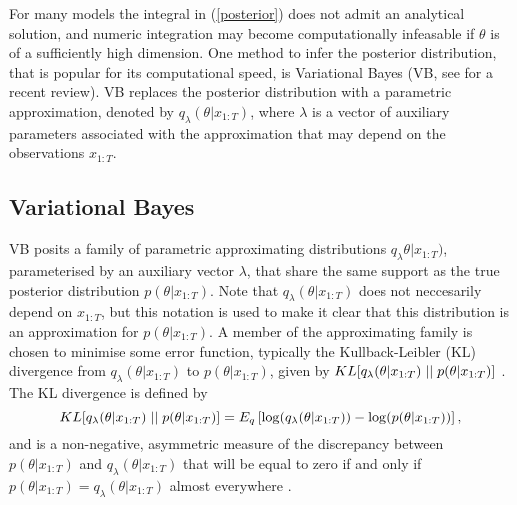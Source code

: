 \documentclass[12pt,a4paper]{article}\usepackage[]{graphicx}\usepackage[]{color}
\begin{document}
For many models the integral in (\ref{posterior}) does not admit an analytical solution, and numeric integration may become computationally infeasable if $\theta$ is of a sufficiently high dimension. One method to infer the posterior distribution, that is popular for its computational speed, is Variational Bayes (VB, see \citet{Blei2017} for a recent review). VB replaces the posterior distribution with a parametric approximation, denoted by $q_{\lambda}(\theta |x_{1:T})$, where $\lambda$ is a vector of auxiliary parameters associated with the approximation that may depend on the observations $x_{1:T}$.

\subsection{Variational Bayes}
\label{subsec:VB}

VB posits a family of parametric approximating distributions $q_{\lambda}\theta |x_{1:T})$, parameterised by an auxiliary vector $\lambda$, that share the same support as the true posterior distribution $p(\theta |x_{1:T})$. Note that $q_{\lambda}(\theta |x_{1:T})$ does not neccesarily depend on $x_{1:T}$, but this notation is used to make it clear that this distribution is an approximation for $p(\theta |x_{1:T})$. A member of the approximating family is chosen to minimise some error function, typically the Kullback-Leibler (KL) divergence from $q_{\lambda}(\theta |x_{1:T})$ to $p(\theta |x_{1:T})$, given by $KL[q_{\lambda}(\theta |x_{1:T})\hspace{.1cm}||\hspace{.1cm}p(\theta |x_{1:T})]$ \citep{Kullback1951}. The KL divergence is defined by
\begin{equation}
\label{KL-def}
KL[q_{\lambda}(\theta |x_{1:T})\hspace{.1cm}||\hspace{.1cm}p(\theta |x_{1:T})] = E_q \left[ \log(q_{\lambda}(\theta |x_{1:T})) - \log(p(\theta |x_{1:T})) \right],
\end{equation}
and is a non-negative, asymmetric measure of the discrepancy between $p(\theta |x_{1:T})$ and $q_{\lambda}(\theta | x_{1:T})$  that will be equal to zero if and only if $p(\theta | x_{1:T}) = q_{\lambda}(\theta | x_{1:T})$ almost everywhere \citep{Bishop2006}.
\\
\end{document}
